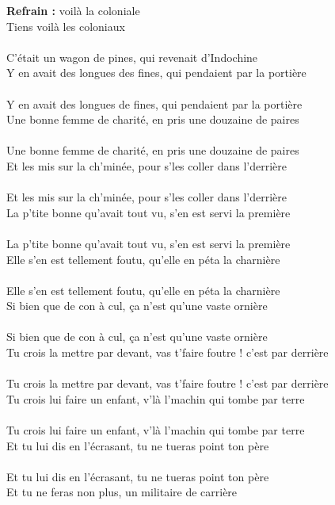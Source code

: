 
\noindent
\textbf{Refrain :}
 voilà la coloniale
\\Tiens voilà les coloniaux
\\\\C'était un wagon de pines, qui revenait d'Indochine
\\Y en avait des longues des fines, qui pendaient par la portière
\\\\Y en avait des longues de fines, qui pendaient par la portière
\\Une bonne femme de charité, en pris une douzaine de paires
\\\\Une bonne femme de charité, en pris une douzaine de paires
\\Et les mis sur la ch'minée, pour s'les coller dans l'derrière
\\\\Et les mis sur la ch'minée, pour s'les coller dans l'derrière
\\La p'tite bonne qu'avait tout vu, s'en est servi la première
\\\\La p'tite bonne qu'avait tout vu, s'en est servi la première
\\Elle s'en est tellement foutu, qu'elle en péta la charnière
\\\\Elle s'en est tellement foutu, qu'elle en péta la charnière
\\Si bien que de con à cul, ça n'est qu'une vaste ornière
\\\\Si bien que de con à cul, ça n'est qu'une vaste ornière
\\Tu crois la mettre par devant, vas t'faire foutre ! c'est par derrière
\\\\Tu crois la mettre par devant, vas t'faire foutre ! c'est par derrière
\\Tu crois lui faire un enfant, v'là l'machin qui tombe par terre
\\\\Tu crois lui faire un enfant, v'là l'machin qui tombe par terre
\\Et tu lui dis en l'écrasant, tu ne tueras point ton père
\\\\Et tu lui dis en l'écrasant, tu ne tueras point ton père
\\Et tu ne feras non plus, un militaire de carrière
\\
\breakpage